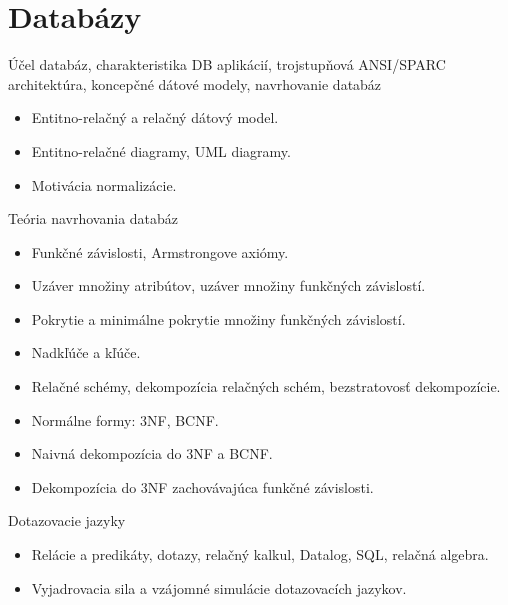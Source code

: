 \documentclass[a4paper]{report}
\begin{document}
\begingroup %
\tableofcontents
\endgroup %

\newpage
{}
\setcounter{page}{1}

\chapter{Databázy}

\begin{zadanie}{Účel databáz, charakteristika DB aplikácií, trojstupňová ANSI/SPARC architektúra, koncepčné dátové modely, navrhovanie databáz}

\begin{itemize}
 \item Entitno-relačný a relačný dátový model.
 \item Entitno-relačné diagramy, UML diagramy.
 \item Motivácia normalizácie.
\end{itemize}
\end{zadanie}

\begin{zadanie}{Teória navrhovania databáz}

\begin{itemize}
 \item Funkčné závislosti, Armstrongove axiómy.
 \item Uzáver množiny atribútov, uzáver množiny funkčných závislostí.
 \item Pokrytie a minimálne pokrytie množiny funkčných závislostí.
 \item Nadkľúče a kľúče.
 \item Relačné schémy, dekompozícia relačných schém, bezstratovosť dekompozície.
 \item Normálne formy: 3NF, BCNF.
 \item Naivná dekompozícia do 3NF a BCNF.
 \item Dekompozícia do 3NF zachovávajúca funkčné závislosti.
\end{itemize}
\end{zadanie}

\begin{zadanie}{Dotazovacie jazyky}
\begin{itemize}
 \item Relácie a predikáty, dotazy, relačný kalkul, Datalog, SQL, relačná algebra.
 \item Vyjadrovacia sila a vzájomné simulácie dotazovacích jazykov.
\end{itemize}
\end{zadanie}
\end{document}
